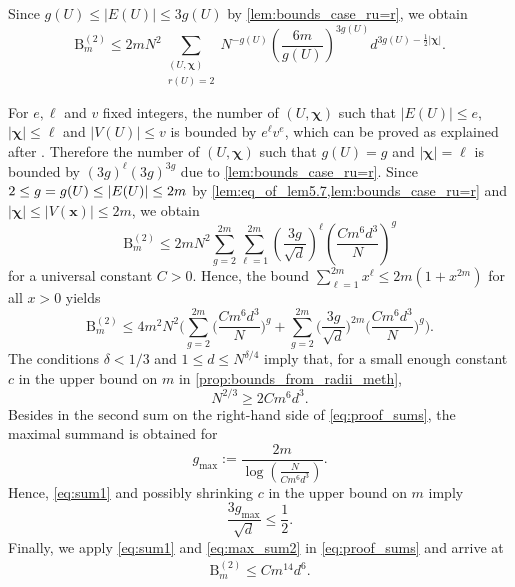 \documentclass[10pt,a4paper]{amsart}
\newcommand{\abs}[1]{\left| #1 \right|}
\newcommand{\patx}{\boldsymbol{x}}
\newcommand{\patchi}{\boldsymbol{\chi}}
\numberwithin{equation}{section}
\newcommand{\nc}{\normalcolor}
\begin{document}
Since $g(U) \leq \abs{E(U)} \leq 3 g(U)$ by \cref{lem:bounds_case_ru=r}, we obtain
\begin{equation*}
    \mathrm{B}_{m}^{(2)}\leq 2m N^2\sum_{\substack{(U,\patchi)\\ r(U)=2}} N^{-g(U)} \left(\frac{6m}{g(U)}\right)^{3g(U)}d^{3g(U) - \frac{1}{2}|\patchi|}. 
\end{equation*}

For $e,\ell$ and $v$ fixed integers, the number of $(U,\patchi)$ such that $|E(U)| \le e$, $|\patchi| \le \ell$ and $|V(U)| \le v$ is bounded by $e^\ell v^e$, which can be proved as explained after 
\cite[proof of Lemma~5.8]{BBK_spec_radii}.  Therefore the number of $(U,\patchi)$ such that $g(U)=g$ and $|\patchi|= \ell$ is bounded by $(3g)^\ell (3g)^{3g}$ due to \cref{lem:bounds_case_ru=r}. 
Since $2 \leq \nc g=g(U) \leq \abs{E(U)} \leq 2m$ by \cref{lem:eq_of_lem5.7,lem:bounds_case_ru=r} and $\abs{\patchi} \leq \abs{V(\patx)} \leq 2m$, we obtain 
\begin{equation*}
       \mathrm{B}_{m}^{(2)} \leq 2m N^2\sum_{g=2}^{2m}\sum_{\ell=1}^{2m}\left(\frac{3g}{\sqrt{d}}\right)^\ell \left(\frac{C m^6d^3}{N}\right)^g 
\end{equation*}
 for a universal constant $C>0$. Hence, the bound $\sum_{\ell=1}^{2m} x^\ell \le 2m(1+x^{2m}) $ for all $x>0$ yields 
\begin{equation} \label{eq:proof_sums} 
    \mathrm{B}_{m}^{(2)} \le 4m^2 N^{2} \biggl(   \sum_{g=2}^{2m}  \biggl(\frac{C m^6d^3}{N}\biggr)^g + \sum_{g=2}^{2m}\biggl(\frac{3g}{\sqrt{d}}\biggr)^{2m} \biggl(\frac{C m^6d^3}{N}\biggr)^g \biggr).
\end{equation}
The conditions $\delta < 1/3$ and $1 \le d \le N^{\delta /4}$ imply that, for a small enough constant $c$ in the upper bound on $m$ in \cref{prop:bounds_from_radii_meth},  
\begin{equation}\label{eq:sum1}
    N^{2/3} \ge2 Cm^6d^3.
\end{equation}
Besides in the second sum on the right-hand side of \cref{eq:proof_sums}, the maximal summand is obtained for 
$$g_{\max}:= \frac{2m}{\log \left(\frac{N}{C m^6d^3}\right)}.$$
Hence, \cref{eq:sum1} and possibly shrinking $c$ in the upper bound on $m$ imply 
\begin{equation}\label{eq:max_sum2}
    \frac{3g_{\max}}{\sqrt{d}} \le \frac{1}{2}.
\end{equation}
Finally, we apply \cref{eq:sum1} and \cref{eq:max_sum2} in \cref{eq:proof_sums} and arrive at   
\begin{align}\label{eq:up_bound_for_B^1}
    \mathrm{B}_{m}^{(2)} \le C m^{14} d^{6}.
\end{align}
\end{document}
